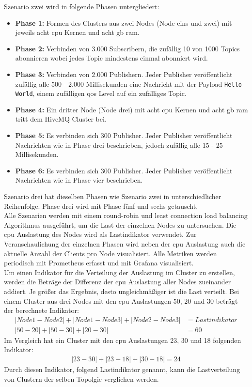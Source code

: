 Szenario zwei wird in folgende Phasen untergliedert:
\begin{itemize}
  \item \textbf{Phase 1:} Formen des Clusters aus zwei Nodes (Node eins und zwei) mit jeweils acht \ac{cpu} Kernen und acht \ac{gb} \ac{ram}.
  \item \textbf{Phase 2:} Verbinden von 3.000 Subscribern, die zufällig 10 von 1000 Topics abonnieren wobei jedes Topic mindestens einmal abonniert wird.
  \item \textbf{Phase 3:} Verbinden von 2.000 Publishern. Jeder Publisher veröffentlicht zufällig alle 500 - 2.000 Millisekunden eine Nachricht mit der Payload \verb|Hello World|, einem zufälligen \ac{qos} Level auf ein zufälliges Topic.
  \item \textbf{Phase 4:} Ein dritter Node (Node drei) mit acht \ac{cpu} Kernen und acht \ac{gb} \ac{ram} tritt dem HiveMQ Cluster bei.
  \item \textbf{Phase 5:} Es verbinden sich 300 Publisher. Jeder Publisher veröffentlicht Nachrichten wie in Phase drei beschrieben, jedoch zufällig alle 15 - 25 Millisekunden.
  \item \textbf{Phase 6:} Es verbinden sich 300 Publisher. Jeder Publisher veröffentlicht Nachrichten wie in Phase vier beschrieben.
\end{itemize}
Szenario drei hat dieselben Phasen wie Szenario zwei in unterschiedlicher Reihenfolge. Phase drei wird mit Phase fünf und sechs getauscht.
\\
Alle Szenarien werden mit einem round-robin und least connection load balancing Algorithmus ausgeführt, um die Last der einzelnen Nodes zu untersuchen. Die \ac{cpu} Auslastung des Nodes wird als Lastindikator verwendet. Zur Veranschaulichung der einzelnen Phasen wird neben der \ac{cpu} Auslastung auch die aktuelle Anzahl der Clients pro Node visualisiert.
Alle Metriken werden periodisch mit Prometheus erfasst und mit Grafana visualisiert.
\\
Um einen Indikator für die Verteilung der Auslastung im Cluster zu erstellen, werden die Beträge der Differenz der \ac{cpu} Auslastung aller Nodes zueinander addiert. Je grö{\ss}er das Ergebnis, desto ungleichmä{\ss}iger ist die Last verteilt.
Bei einem Cluster aus drei Nodes mit den \ac{cpu} Auslastungen 50, 20 und 30 beträgt der berechnete Indikator:
\begin{align}
    |Node 1 - Node 2| + |Node 1 - Node 3| + |Node 2 - Node 3| & = Lastindikator
    \\
    |50 - 20| + |50 - 30| + |20 - 30| & = 60
\end{align}
Im Vergleich hat ein Cluster mit den \ac{cpu} Auslastungen 23, 30 und 18 folgenden Indikator:
\begin{align}
   |23 - 30| + |23 - 18| + |30 - 18| = 24
\end{align}
Durch diesen Indikator, folgend Lastindikator genannt, kann die Lastverteilung von Clustern der selben Topolgie verglichen werden.

